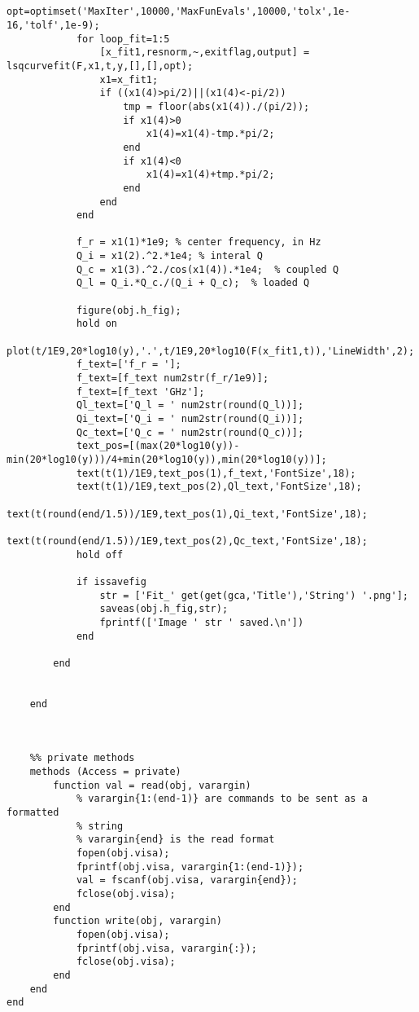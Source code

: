 \begin{lstlisting}
    
            opt=optimset('MaxIter',10000,'MaxFunEvals',10000,'tolx',1e-16,'tolf',1e-9);
            for loop_fit=1:5            
                [x_fit1,resnorm,~,exitflag,output] = lsqcurvefit(F,x1,t,y,[],[],opt);
                x1=x_fit1;
                if ((x1(4)>pi/2)||(x1(4)<-pi/2))
                    tmp = floor(abs(x1(4))./(pi/2));
                    if x1(4)>0
                        x1(4)=x1(4)-tmp.*pi/2;
                    end
                    if x1(4)<0
                        x1(4)=x1(4)+tmp.*pi/2;
                    end
                end
            end
            
            f_r = x1(1)*1e9; % center frequency, in Hz
            Q_i = x1(2).^2.*1e4; % interal Q
            Q_c = x1(3).^2./cos(x1(4)).*1e4;  % coupled Q
            Q_l = Q_i.*Q_c./(Q_i + Q_c);  % loaded Q
            
            figure(obj.h_fig);
            hold on
            plot(t/1E9,20*log10(y),'.',t/1E9,20*log10(F(x_fit1,t)),'LineWidth',2);
            f_text=['f_r = '];
            f_text=[f_text num2str(f_r/1e9)];
            f_text=[f_text 'GHz'];
            Ql_text=['Q_l = ' num2str(round(Q_l))];
            Qi_text=['Q_i = ' num2str(round(Q_i))];
            Qc_text=['Q_c = ' num2str(round(Q_c))];
            text_pos=[(max(20*log10(y))-min(20*log10(y)))/4+min(20*log10(y)),min(20*log10(y))];
            text(t(1)/1E9,text_pos(1),f_text,'FontSize',18);
            text(t(1)/1E9,text_pos(2),Ql_text,'FontSize',18);
            text(t(round(end/1.5))/1E9,text_pos(1),Qi_text,'FontSize',18);
            text(t(round(end/1.5))/1E9,text_pos(2),Qc_text,'FontSize',18);
            hold off
            
            if issavefig
                str = ['Fit_' get(get(gca,'Title'),'String') '.png'];
                saveas(obj.h_fig,str);   
                fprintf(['Image ' str ' saved.\n'])
            end

        end
        
        
    end
    
        
    
    %% private methods
    methods (Access = private)
        function val = read(obj, varargin)
            % varargin{1:(end-1)} are commands to be sent as a formatted
            % string
            % varargin{end} is the read format
            fopen(obj.visa);
            fprintf(obj.visa, varargin{1:(end-1)});
            val = fscanf(obj.visa, varargin{end});
            fclose(obj.visa);
        end
        function write(obj, varargin)
            fopen(obj.visa);
            fprintf(obj.visa, varargin{:});
            fclose(obj.visa);
        end
    end
end
  \end{lstlisting}
    
